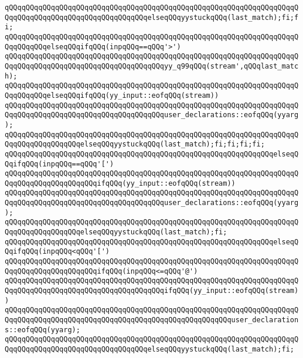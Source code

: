 \verb|qQQqqQQqqQQqqQQqqQQqqQQqqQQqqQQqqQQqqQQqqQQqqQQqqQQqqQQqqQQqqQQqqQQqqQQqqQQqqQQqqQQqqQQqqQQqqQQqqQQqqQQqelseqQQqyystuckqQQq(last_match);fi;fi;|\newline
\verb|qQQqqQQqqQQqqQQqqQQqqQQqqQQqqQQqqQQqqQQqqQQqqQQqqQQqqQQqqQQqqQQqqQQqqQQqqQQqqQQqelseqQQqifqQQq(inpqQQq==qQQq'>')|\newline
\verb|qQQqqQQqqQQqqQQqqQQqqQQqqQQqqQQqqQQqqQQqqQQqqQQqqQQqqQQqqQQqqQQqqQQqqQQqqQQqqQQqqQQqqQQqqQQqqQQqqQQqqQQqqQQqyy_q99qQQq(stream',qQQqlast_match);|\newline
\verb|qQQqqQQqqQQqqQQqqQQqqQQqqQQqqQQqqQQqqQQqqQQqqQQqqQQqqQQqqQQqqQQqqQQqqQQqqQQqqQQqelseqQQqifqQQq(yy_input::eofqQQq(stream))|\newline
\verb|qQQqqQQqqQQqqQQqqQQqqQQqqQQqqQQqqQQqqQQqqQQqqQQqqQQqqQQqqQQqqQQqqQQqqQQqqQQqqQQqqQQqqQQqqQQqqQQqqQQqqQQqqQQquser_declarations::eofqQQq(yyarg);|\newline
\verb|qQQqqQQqqQQqqQQqqQQqqQQqqQQqqQQqqQQqqQQqqQQqqQQqqQQqqQQqqQQqqQQqqQQqqQQqqQQqqQQqqQQqqQQqelseqQQqyystuckqQQq(last_match);fi;fi;fi;fi;|\newline
\verb|qQQqqQQqqQQqqQQqqQQqqQQqqQQqqQQqqQQqqQQqqQQqqQQqqQQqqQQqqQQqqQQqelseqQQqifqQQq(inpqQQq==qQQq'[')|\newline
\verb|qQQqqQQqqQQqqQQqqQQqqQQqqQQqqQQqqQQqqQQqqQQqqQQqqQQqqQQqqQQqqQQqqQQqqQQqqQQqqQQqqQQqqQQqqQQqifqQQq(yy_input::eofqQQq(stream))|\newline
\verb|qQQqqQQqqQQqqQQqqQQqqQQqqQQqqQQqqQQqqQQqqQQqqQQqqQQqqQQqqQQqqQQqqQQqqQQqqQQqqQQqqQQqqQQqqQQqqQQqqQQqqQQqqQQquser_declarations::eofqQQq(yyarg);|\newline
\verb|qQQqqQQqqQQqqQQqqQQqqQQqqQQqqQQqqQQqqQQqqQQqqQQqqQQqqQQqqQQqqQQqqQQqqQQqqQQqqQQqqQQqqQQqelseqQQqyystuckqQQq(last_match);fi;|\newline
\verb|qQQqqQQqqQQqqQQqqQQqqQQqqQQqqQQqqQQqqQQqqQQqqQQqqQQqqQQqqQQqqQQqelseqQQqifqQQq(inpqQQq<qQQq'[')|\newline
\verb|qQQqqQQqqQQqqQQqqQQqqQQqqQQqqQQqqQQqqQQqqQQqqQQqqQQqqQQqqQQqqQQqqQQqqQQqqQQqqQQqqQQqqQQqqQQqifqQQq(inpqQQq<=qQQq'@')|\newline
\verb|qQQqqQQqqQQqqQQqqQQqqQQqqQQqqQQqqQQqqQQqqQQqqQQqqQQqqQQqqQQqqQQqqQQqqQQqqQQqqQQqqQQqqQQqqQQqqQQqqQQqqQQqqQQqifqQQq(yy_input::eofqQQq(stream))|\newline
\verb|qQQqqQQqqQQqqQQqqQQqqQQqqQQqqQQqqQQqqQQqqQQqqQQqqQQqqQQqqQQqqQQqqQQqqQQqqQQqqQQqqQQqqQQqqQQqqQQqqQQqqQQqqQQqqQQqqQQqqQQqqQQquser_declarations::eofqQQq(yyarg);|\newline
\verb|qQQqqQQqqQQqqQQqqQQqqQQqqQQqqQQqqQQqqQQqqQQqqQQqqQQqqQQqqQQqqQQqqQQqqQQqqQQqqQQqqQQqqQQqqQQqqQQqqQQqqQQqelseqQQqyystuckqQQq(last_match);fi;|\newline

